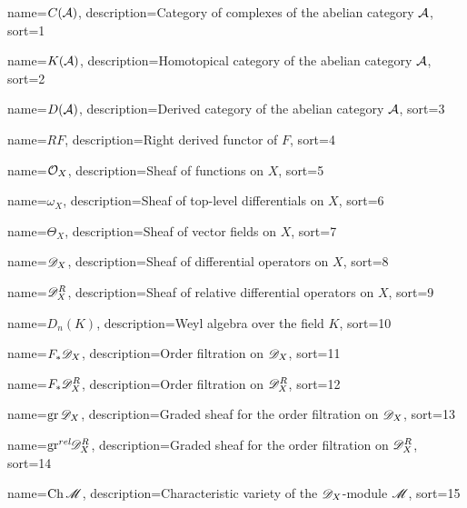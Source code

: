 

{
  name={\ensuremath{C(\AA)}},
  description={Category of complexes of the abelian category $\AA$},
  sort=1
}



{
  name={\ensuremath{K(\AA)}},
  description={Homotopical category of the abelian category $\AA$},
  sort=2
}


{
  name={\ensuremath{D(\AA)}},
  description={Derived category of the abelian category $\AA$},
  sort=3
}

{
  name={\ensuremath{RF}},
  description={Right derived functor of $F$},
  sort=4
}


{
  name={\ensuremath{\O_X}},
  description={Sheaf of functions on $X$},
  sort=5
}


{
  name={\ensuremath{\omega_X}},
  description={Sheaf of top-level differentials on $X$},
  sort=6
}

{
  name={\ensuremath{\Theta_X}},
  description={Sheaf of vector fields on $X$},
  sort=7
}



{
  name={\ensuremath{\D_X}},
  description={Sheaf of differential operators on $X$},
  sort=8
}


{
  name={\ensuremath{\D_X^R}},
  description={Sheaf of relative differential operators on $X$},
  sort=9
}


{
  name={\ensuremath{D_n(K)}},
  description={Weyl algebra over the field $K$},
  sort=10
}


{
  name={\ensuremath{F_*\D_X}},
  description={Order filtration on $\D_X$},
  sort=11
}


{
  name={\ensuremath{F_*\D_X^R}},
  description={Order filtration on $\D_X^R$},
  sort=12
}



{
  name={\ensuremath{\gr \D_X}},
  description={Graded sheaf for the order filtration on $\D_X$},
  sort=13
}



{
  name={\ensuremath{\grrel \D_X^R}},
  description={Graded sheaf for the order filtration on $\D_X^R$},
  sort=14
}

{
  name={\ensuremath{\Ch \M}},
  description={Characteristic variety of the $\D_X$-module $\M$},
  sort=15
}


